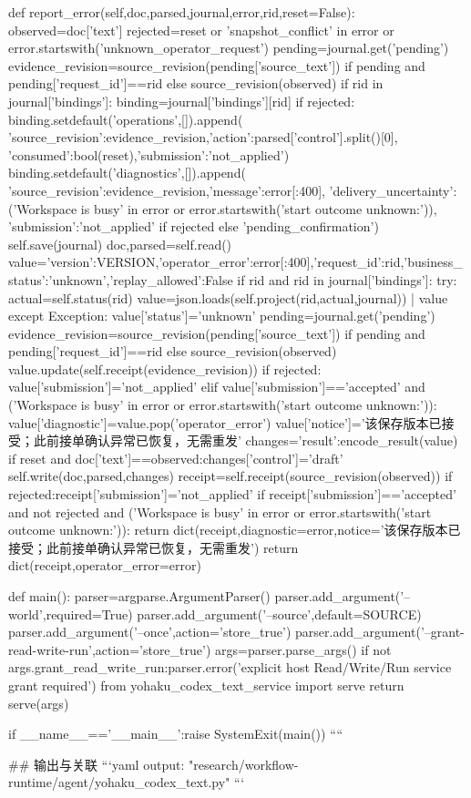     def report_error(self,doc,parsed,journal,error,rid,reset=False):
        observed=doc['text']
        rejected=reset or 'snapshot_conflict' in error or error.startswith('unknown_operator_request')
        pending=journal.get('pending')
        evidence_revision=source_revision(pending['source_text']) if pending and pending['request_id']==rid else source_revision(observed)
        if rid in journal['bindings']:
            binding=journal['bindings'][rid]
            if rejected:
                binding.setdefault('operations',[]).append({
                    'source_revision':evidence_revision,'action':parsed['control'].split()[0],
                    'consumed':bool(reset),'submission':'not_applied'})
            binding.setdefault('diagnostics',[]).append({
                'source_revision':evidence_revision,'message':error[:400],
                'delivery_uncertainty':('Workspace is busy' in error or error.startswith('start outcome unknown:')),
                'submission':'not_applied' if rejected else 'pending_confirmation'})
            self.save(journal)
        doc,parsed=self.read()
        value={'version':VERSION,'operator_error':error[:400],'request_id':rid,'business_status':'unknown','replay_allowed':False}
        if rid and rid in journal['bindings']:
            try:
                actual=self.status(rid)
                value=json.loads(self.project(rid,actual,journal)) | value
            except Exception:
                value['status']='unknown'
        pending=journal.get('pending')
        evidence_revision=source_revision(pending['source_text']) if pending and pending['request_id']==rid else source_revision(observed)
        value.update(self.receipt(evidence_revision))
        if rejected:
            value['submission']='not_applied'
        elif value['submission']=='accepted' and ('Workspace is busy' in error or error.startswith('start outcome unknown:')):
            value['diagnostic']=value.pop('operator_error')
            value['notice']='该保存版本已接受；此前接单确认异常已恢复，无需重发'
        changes={'result':encode_result(value)}
        if reset and doc['text']==observed:changes['control']='draft\n'
        self.write(doc,parsed,changes)
        receipt=self.receipt(source_revision(observed))
        if rejected:receipt['submission']='not_applied'
        if receipt['submission']=='accepted' and not rejected and ('Workspace is busy' in error or error.startswith('start outcome unknown:')):
            return dict(receipt,diagnostic=error,notice='该保存版本已接受；此前接单确认异常已恢复，无需重发')
        return dict(receipt,operator_error=error)

def main():
    parser=argparse.ArgumentParser()
    parser.add_argument('--world',required=True)
    parser.add_argument('--source',default=SOURCE)
    parser.add_argument('--once',action='store_true')
    parser.add_argument('--grant-read-write-run',action='store_true')
    args=parser.parse_args()
    if not args.grant_read_write_run:parser.error('explicit host Read/Write/Run service grant required')
    from yohaku_codex_text_service import serve
    return serve(args)

if __name__=='__main__':raise SystemExit(main())
````

## 输出与关联
```yaml
output: "research/workflow-runtime/agent/yohaku_codex_text.py"
```
